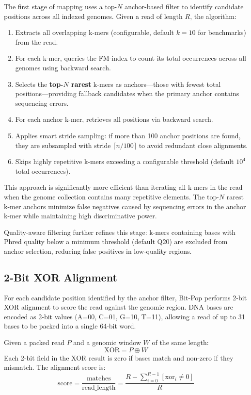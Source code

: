 \documentclass[10pt]{article}
\begin{document}
The first stage of mapping uses a top-$N$ anchor-based filter to identify candidate positions across all indexed genomes. Given a read of length $R$, the algorithm:
\begin{enumerate}
    \item Extracts all overlapping k-mers (configurable, default $k=10$ for benchmarks) from the read.
    \item For each k-mer, queries the FM-index to count its total occurrences across all genomes using backward search.
    \item Selects the \textbf{top-$N$ rarest} k-mers as anchors---those with fewest total positions---providing fallback candidates when the primary anchor contains sequencing errors.
    \item For each anchor k-mer, retrieves all positions via backward search.
    \item Applies smart stride sampling: if more than 100 anchor positions are found, they are subsampled with stride $\lceil n/100 \rceil$ to avoid redundant close alignments.
    \item Skips highly repetitive k-mers exceeding a configurable threshold (default $10^4$ total occurrences).
\end{enumerate}

This approach is significantly more efficient than iterating all k-mers in the read when the genome collection contains many repetitive elements. The top-$N$ rarest k-mer anchors minimize false negatives caused by sequencing errors in the anchor k-mer while maintaining high discriminative power.

Quality-aware filtering further refines this stage: k-mers containing bases with Phred quality below a minimum threshold (default Q20) are excluded from anchor selection, reducing false positives in low-quality regions.

\subsection{2-Bit XOR Alignment}

For each candidate position identified by the anchor filter, Bit-Pop performs 2-bit XOR alignment to score the read against the genomic region. DNA bases are encoded as 2-bit values (A=00, C=01, G=10, T=11), allowing a read of up to 31 bases to be packed into a single 64-bit word.

Given a packed read $P$ and a genomic window $W$ of the same length:
\[
\text{XOR} = P \oplus W
\]
Each 2-bit field in the XOR result is zero if bases match and non-zero if they mismatch. The alignment score is:
\[
\text{score} = \frac{\text{matches}}{\text{read\_length}} = \frac{R - \sum_{i=0}^{R-1} [\text{xor}_i \neq 0]}{R}
\]
\end{document}
